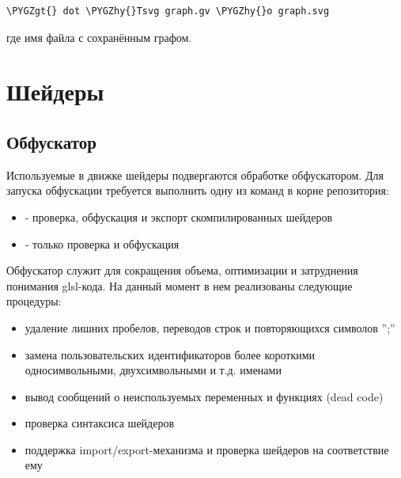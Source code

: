 \documentclass[a4paper,12pt,oneside]{sphinxmanual}
\def\PYGZgt{\char`\>}
\def\PYGZhy{\char`\-}
\begin{document}
\begin{Verbatim}[commandchars=\\\{\}]
\PYGZgt{} dot \PYGZhy{}Tsvg graph.gv \PYGZhy{}o graph.svg
\end{Verbatim}

где  имя файла с сохранённым графом.


\section{Шейдеры}
\label{developers_advanced:shaders}\label{developers_advanced:id8}

\subsection{Обфускатор}
\label{developers_advanced:index-0}\label{developers_advanced:id9}
Используемые в движке шейдеры подвергаются обработке обфускатором.
Для запуска обфускации требуется выполнить одну из команд в корне репозитория:
\begin{itemize}
\item {} 
 - проверка, обфускация и экспорт скомпилированных шейдеров

\item {} 
 - только проверка и обфускация

\end{itemize}

Обфускатор служит для сокращения объема, оптимизации и затруднения понимания
glsl-кода. На данный момент в нем реализованы следующие процедуры:
\begin{itemize}
\item {} 
удаление лишних пробелов, переводов строк и повторяющихся символов '';''

\item {} 
замена пользовательских идентификаторов более короткими односимвольными, двухсимвольными и т.д. именами

\item {} 
вывод сообщений о неиспользуемых переменных и функциях (dead code)

\item {} 
проверка синтаксиса шейдеров

\item {} 
поддержка import/export-механизма и проверка шейдеров на соответствие ему

\end{itemize}
\end{document}
